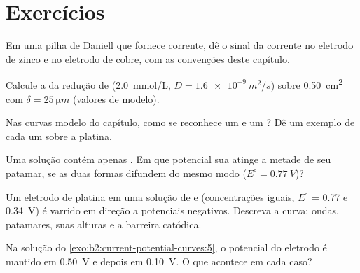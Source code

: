 \section{Exercícios}

\begin{exercise}[$\star$]\label{exo:b2:current-potential-curves:1}
Em uma pilha de Daniell que fornece corrente, dê o sinal da corrente no
eletrodo de zinco e no eletrodo de cobre, com as convenções deste
capítulo.
\end{exercise}

\begin{exercise}[$\star$]\label{exo:b2:current-potential-curves:2}
Calcule a  da redução de  (\qty{2.0}{mmol/L}, $D =
\qty{1.6e-9}{m^2/s}$) sobre \qty{0.50}{cm^2} com $\delta = \qty{25}{\micro m}$
(valores de modelo).
\end{exercise}

\begin{exercise}[$\star$]\label{exo:b2:current-potential-curves:3}
Nas curvas modelo do capítulo, como se reconhece um  e um
? Dê um exemplo de cada um sobre a platina.
\end{exercise}

\begin{exercise}[$\star$]\label{exo:b2:current-potential-curves:4}
Uma solução contém apenas . Em que potencial sua 
atinge a metade de seu patamar, se as duas formas difundem do mesmo modo ($E^\circ = \qty{0.77}{V}$)?
\end{exercise}

\begin{exercise}[$\star\star$]\label{exo:b2:current-potential-curves:5}
Um eletrodo de platina em uma solução de  e  (concentrações
iguais, $E^\circ$ = 0.77 e \qty{0.34}{V}) é varrido em direção a potenciais
negativos. Descreva a curva: ondas, patamares, suas alturas e a barreira
catódica.
\end{exercise}

\begin{exercise}[$\star\star$]\label{exo:b2:current-potential-curves:6}
Na solução do \cref{exo:b2:current-potential-curves:5}, o potencial do
eletrodo é mantido em \qty{0.50}{V} e depois em \qty{0.10}{V}. O que acontece
em cada caso?
\end{exercise}

